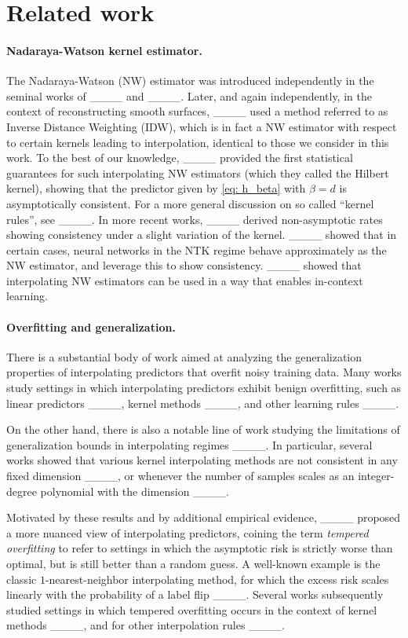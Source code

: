 \section{Related work}
\label{sec: related}
\paragraph{Nadaraya-Watson kernel estimator. } The Nadaraya-Watson (NW) estimator was introduced independently in the seminal works of ____ and ____. Later, and again independently, in the context of reconstructing smooth surfaces, ____ used a method referred to as Inverse Distance Weighting (IDW), which is in fact a NW estimator with respect to certain kernels leading to interpolation, identical to those we consider in this work. To the best of our knowledge, ____ provided the first statistical guarantees for such interpolating NW estimators (which they called the Hilbert kernel), showing that the predictor given by \eqref{eq: h_beta} with $\beta=d$ is asymptotically consistent.
For a more general discussion on so called ``kernel rules'', see ____.
In more recent works, ____ derived non-asymptotic rates showing consistency under a slight variation of the kernel. ____ showed that in certain cases, neural networks in the NTK regime behave approximately as the NW estimator, and leverage this to show consistency. ____ showed that interpolating NW estimators can be used in a way that enables in-context learning. 



\paragraph{Overfitting and generalization.}

There is a substantial body of work aimed at analyzing the generalization properties of interpolating predictors that overfit noisy training data.
Many works study settings in which interpolating predictors exhibit benign overfitting,
such as linear predictors ____,
kernel methods ____, and other learning rules ____.

On the other hand, there is also a notable line of work studying the limitations of generalization bounds in interpolating regimes ____.
In particular, several works showed that various kernel interpolating methods are not consistent in any fixed dimension ____, 
or whenever the number of samples scales
as an integer-degree polynomial with the dimension
____.

Motivated by these results and by additional empirical evidence, ____ proposed a more nuanced view of interpolating predictors,
coining the term \emph{tempered overfitting} to refer to settings in which the asymptotic risk is strictly worse than optimal, but is still better than a random guess. 
A well-known example is the classic $1$-nearest-neighbor interpolating method, for which the excess risk scales linearly with the probability of a label flip ____.
Several works subsequently studied settings in which tempered overfitting occurs in the context of kernel methods
____,
and for other interpolation rules
____.


